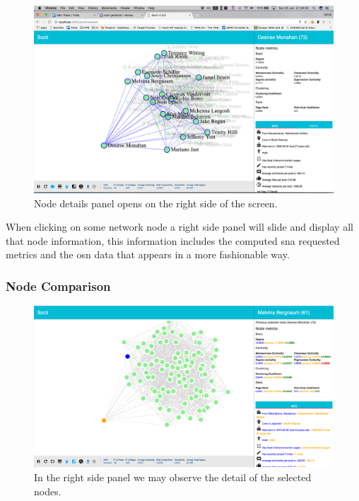 \begin{figure}[h!]
\begin{center}
  \hspace*{-0.8in}
  \includegraphics[width=1.2\textwidth]{img/socii/socii_6.png}
\end{center}
\caption{\label{img:socii_6} Node details panel opens on the right side of the screen.}
\end{figure}

When clicking on some network node a right side panel will slide and display all that node information, this information includes the computed \gls{sna} requested metrics and the \gls{osn} data that appears in a more fashionable way.

\subsubsection{Node Comparison}

\begin{figure}[h!]
\begin{center}
  \hspace*{-0.8in}
  \includegraphics[width=1.2\textwidth]{img/socii/socii_7.png}
\end{center}
\caption{\label{img:socii_7} In the right side panel we may observe the detail of the selected nodes.}
\end{figure}

